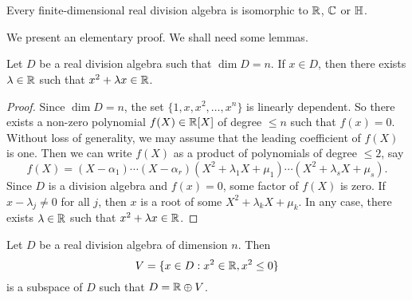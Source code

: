 \chapter{}


\begin{theorem}[Frobenius]
	\label{thm:Frobenius}
	Every finite-dimensional real division algebra is isomorphic to $\mathbb{R}$, $\mathbb{C}$
	or $\mathbb{H}$.
\end{theorem}

We present an elementary proof. We shall need some lemmas. 

\begin{lemma}
	\label{lem:trick_frobenius1}
	Let $D$ be a real division algebra such that $\dim D=n$. If $x\in D$, then
	there exists $\lambda\in\mathbb{R}$ such that $x^2+\lambda x\in\mathbb{R}$.
\end{lemma}

\begin{proof}
	Since $\dim D=n$, the set $\{1,x,x^2,\dots,x^n\}$ is linearly dependent. So
	there exists a non-zero polynomial $f(X)\in\mathbb{R}[X]$ of degree $\leq n$ such
	that $f(x)=0$. Without loss of generality, we may assume that the leading
	coefficient of $f(X)$ is one. Then we can write $f(X)$ as a product of
	polynomials of degree $\leq2$, say 
	\[
		f(X)=(X-\alpha_1)\cdots (X-\alpha_r)(X^2+\lambda_1 X+\mu_1)\cdots (X^2+\lambda_s X+\mu_s).
	\]
	Since $D$ is a division algebra and $f(x)=0$, some factor of $f(X)$ is
	zero. If $x-\lambda_j\ne 0$ for all $j$, then $x$ is a root of some
	$X^2+\lambda_k X+\mu_k$. In any case, there exists $\lambda\in\mathbb{R}$ such that
	$x^2+\lambda x\in\mathbb{R}$. 
\end{proof}

\begin{lemma}
	\label{lem:trick_frobenius2}
	Let $D$ be a real division algebra of dimension $n$. Then
	\[
		V=\{x\in D:x^2\in\mathbb{R},x^2\leq 0\}
	\]
	is a subspace of $D$ such that $D=\mathbb{R}\oplus V$.
\end{lemma}

